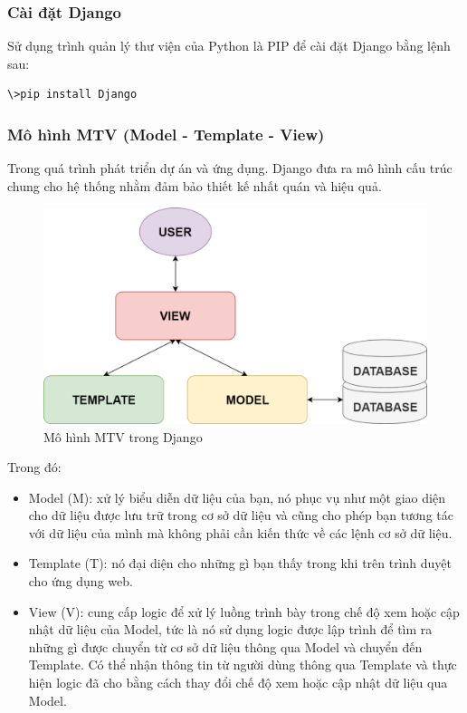 \subsubsection{Cài đặt Django}
Sử dụng trình quản lý thư viện của Python là PIP để cài đặt Django bằng lệnh sau:
\begin{lstlisting}[language=bash]
\>pip install Django
\end{lstlisting}
\subsubsection{Mô hình MTV (Model - Template - View)}
Trong quá trình phát triển dự án và ứng dụng. Django đưa ra mô hình cấu trúc chung cho hệ thống nhằm đảm bảo thiết kế nhất quán và hiệu quả\cite{mtv}.
\begin{center}
	\begin{figure}[!ht]
		\centering
		\includegraphics[width=120mm]{images/mtv.png}
		\caption{Mô hình MTV trong Django}
	\end{figure}
\end{center}
\par
Trong đó:
\begin{itemize}
	\item Model (M): xử lý biểu diễn dữ liệu của bạn, nó phục vụ như một giao diện cho dữ liệu được lưu trữ trong cơ sở dữ liệu và cũng cho phép bạn tương tác với dữ liệu của mình mà không phải cần kiến thức về các lệnh cơ sở dữ liệu.
	\item Template (T): nó đại diện cho những gì bạn thấy trong khi trên trình duyệt cho ứng dụng web.
	\item View (V): cung cấp logic để xử lý luồng trình bày trong chế độ xem hoặc cập nhật dữ liệu của Model, tức là nó sử dụng logic được lập trình để tìm ra những gì được chuyển từ cơ sở dữ liệu thông qua Model và chuyển đến Template. Có thể nhận thông tin từ người dùng thông qua Template và thực hiện logic đã cho bằng cách thay đổi chế độ xem hoặc cập nhật dữ liệu qua Model.
\end{itemize}
